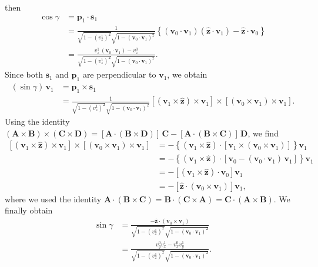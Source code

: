 \documentclass[english,a4paper]{kiseon_memo}
\begin{document}
then
\begin{align*}
\cos\gamma & = \mathbf{p}_{1}\!\cdot\!\mathbf{s}_{1}\\
& = \frac{1}{\sqrt{1-(v_{z}^{1})^{2}}\sqrt{1-(\mathbf{v}_{0}\!\cdot\!\mathbf{v}_{1})^{2}}}\!\left\{(\mathbf{v}_{0}\!\cdot\!\mathbf{v}_{1})(\hat{\mathbf{z}}\!\cdot\!\mathbf{v}_{1}) - \hat{\mathbf{z}}\!\cdot\!\mathbf{v}_{0}\right\}\\
& = \frac{v_{z}^{1}\,(\mathbf{v}_{0}\!\cdot\!\mathbf{v}_{1}) - v_{z}^{0}}{\sqrt{1-(v_{z}^{1})^{2}}\sqrt{1-(\mathbf{v}_{0}\!\cdot\!\mathbf{v}_{1})^{2}}}.
\end{align*}
Since both $\mathbf{s}_{1}$ and $\mathbf{p}_{1}$ are perpendicular
to $\mathbf{v}_{1}$, we obtain
\begin{align*}
(\sin\gamma)\,\mathbf{v}_{1} & = \mathbf{p}_{1}\times\mathbf{s}_{1}\\
& = \frac{1}{\sqrt{1-(v_{z}^{1})^{2}}\sqrt{1-(\mathbf{v}_{0}\!\cdot\!\mathbf{v}_{1})^{2}}}\!\left[\left(\mathbf{v}_{1}\times\hat{\mathbf{z}}\right)\times\mathbf{v}_{1}\right]\!\times\!\left[\left(\mathbf{v}_{0}\times\mathbf{v}_{1}\right)\times\mathbf{v}_{1}\right].
\end{align*}
Using the identity
$(\mathbf{A}\times\mathbf{B})\times(\mathbf{C}\times\mathbf{D}) = [\mathbf{A}\!\cdot\!(\mathbf{B}\times\mathbf{D})]\,\mathbf{C} - [\mathbf{A}\!\cdot\!(\mathbf{B}\times\mathbf{C})]\,\mathbf{D}$,
we find
\begin{align*}
\left[\left(\mathbf{v}_{1}\times\hat{\mathbf{z}}\right)\times\mathbf{v}_{1}\right]\!\times\!\left[\left(\mathbf{v}_{0}\times\mathbf{v}_{1}\right)\times\mathbf{v}_{1}\right]
& = -\left\{\left(\mathbf{v}_{1}\times\hat{\mathbf{z}}\right)\!\cdot\!\left[\mathbf{v}_{1}\times\left(\mathbf{v}_{0}\times\mathbf{v}_{1}\right)\right]\right\}\mathbf{v}_{1}\\
& = -\left\{\left(\mathbf{v}_{1}\times\hat{\mathbf{z}}\right)\!\cdot\!\left[\mathbf{v}_{0} - (\mathbf{v}_{0}\!\cdot\!\mathbf{v}_{1})\,\mathbf{v}_{1}\right]\right\}\mathbf{v}_{1}\\
& = -\left[\left(\mathbf{v}_{1}\times\hat{\mathbf{z}}\right)\!\cdot\!\mathbf{v}_{0}\right]\mathbf{v}_{1}\\
& = -\left[\hat{\mathbf{z}}\!\cdot\!\left(\mathbf{v}_{0}\times\mathbf{v}_{1}\right)\right]\mathbf{v}_{1},
\end{align*}
where we used the identity
$\mathbf{A}\!\cdot\!(\mathbf{B}\times\mathbf{C}) = \mathbf{B}\!\cdot\!(\mathbf{C}\times\mathbf{A}) = \mathbf{C}\!\cdot\!(\mathbf{A}\times\mathbf{B})$.
We finally obtain
\begin{align*}
\sin\gamma & = \frac{-\hat{\mathbf{z}}\!\cdot\!(\mathbf{v}_{0}\times\mathbf{v}_{1})}{\sqrt{1-(v_{z}^{1})^{2}}\sqrt{1-(\mathbf{v}_{0}\!\cdot\!\mathbf{v}_{1})^{2}}}\\
& = \frac{v_{y}^{0}v_{x}^{1} - v_{x}^{0}v_{y}^{1}}{\sqrt{1-(v_{z}^{1})^{2}}\sqrt{1-(\mathbf{v}_{0}\!\cdot\!\mathbf{v}_{1})^{2}}}.
\end{align*}
\end{document}
